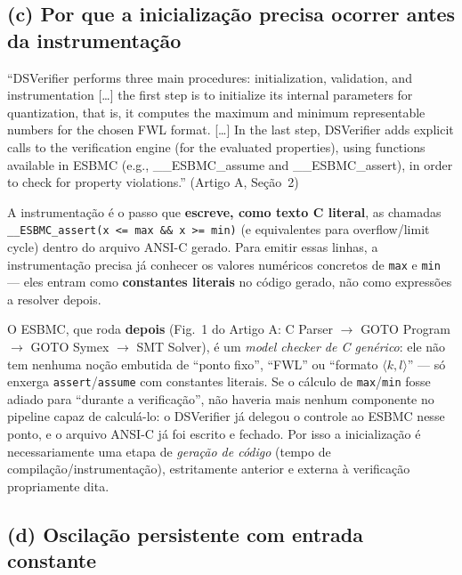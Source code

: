 \documentclass[12pt,a4paper]{article}
\newcommand{\vv}[1]{\texttt{#1}}
\begin{document}
\subsection{(c) Por que a inicialização precisa ocorrer antes da instrumentação}

\begin{tcolorbox}[quotebox]
``DSVerifier performs three main procedures: initialization, validation, and instrumentation
[\ldots] the first step is to initialize its internal parameters for quantization, that is, it
computes the maximum and minimum representable numbers for the chosen FWL format. [\ldots] In
the last step, DSVerifier adds explicit calls to the verification engine (for the evaluated
properties), using functions available in ESBMC (e.g., \_\_ESBMC\_assume and
\_\_ESBMC\_assert), in order to check for property violations.'' (Artigo A, Se\c{c}\~ao~2)
\end{tcolorbox}

A instrumenta\c{c}\~ao \'e o passo que \textbf{escreve, como texto C literal}, as chamadas
\vv{\_\_ESBMC\_assert(x <= max \&\& x >= min)} (e equivalentes para overflow/limit
cycle) dentro do arquivo ANSI-C gerado. Para emitir essas linhas, a instrumenta\c{c}\~ao
precisa j\'a conhecer os valores num\'ericos concretos de \vv{max} e \vv{min} --- eles
entram como \textbf{constantes literais} no c\'odigo gerado, n\~ao como express\~oes a
resolver depois.

\begin{tcolorbox}[notabox]
O ESBMC, que roda \textbf{depois} (Fig.~1 do Artigo A: C Parser $\to$ GOTO Program $\to$ GOTO
Symex $\to$ SMT Solver), \'e um \emph{model checker de C gen\'erico}: ele n\~ao tem nenhuma
no\c{c}\~ao embutida de ``ponto fixo'', ``FWL'' ou ``formato $\langle k,l\rangle$'' --- s\'o
enxerga \vv{assert}/\vv{assume} com constantes literais. Se o c\'alculo de \vv{max}/\vv{min}
fosse adiado para ``durante a verifica\c{c}\~ao'', n\~ao haveria mais nenhum componente no
pipeline capaz de calcul\'a-lo: o DSVerifier j\'a delegou o controle ao ESBMC nesse ponto, e o
arquivo ANSI-C j\'a foi escrito e fechado. Por isso a inicializa\c{c}\~ao \'e necessariamente
uma etapa de \emph{gera\c{c}\~ao de c\'odigo} (tempo de compila\c{c}\~ao/instrumenta\c{c}\~ao),
estritamente anterior e externa \`a verifica\c{c}\~ao propriamente dita.
\end{tcolorbox}

\subsection{(d) Oscilação persistente com entrada constante}
\end{document}
